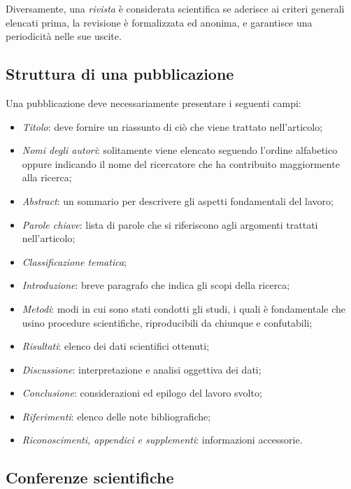 Diversamente, una \textit{rivista} è considerata scientifica se aderisce ai criteri
generali elencati prima, la revisione è formalizzata ed anonima, e garantisce una
periodicità nelle sue uscite.

\subsection{Struttura di una pubblicazione}

Una pubblicazione deve necessariamente presentare i seguenti campi:
\begin{itemize}
    \item \textit{Titolo}: deve fornire un riassunto di ciò che viene trattato
    nell'articolo;
    \item \textit{Nomi degli autori}: solitamente viene elencato seguendo
    l'ordine alfabetico oppure indicando il nome del ricercatore che ha
    contribuito maggiormente alla ricerca;
    \item \textit{Abstract}: un sommario per descrivere gli aspetti fondamentali
    del lavoro;
    \item \textit{Parole chiave}: lista di parole che si riferiscono agli
    argomenti trattati nell'articolo;
    \item \textit{Classificazione tematica};
    \item \textit{Introduzione}: breve paragrafo che indica gli scopi della ricerca;
    \item \textit{Metodi}: modi in cui sono stati condotti gli studi, i quali
    è fondamentale che usino procedure scientifiche, riproducibili da chiunque
    e confutabili;
    \item \textit{Risultati}: elenco dei dati scientifici ottenuti;
    \item \textit{Discussione}: interpretazione e analisi oggettiva dei dati;
    \item \textit{Conclusione}: considerazioni ed epilogo del lavoro svolto;
    \item \textit{Riferimenti}: elenco delle note bibliografiche;
    \item \textit{Riconoscimenti, appendici e supplementi}: informazioni accessorie.
\end{itemize}

\subsection{Conferenze scientifiche}\label{sec:conferenze}
\label{sec:conferenze_scientifiche}

